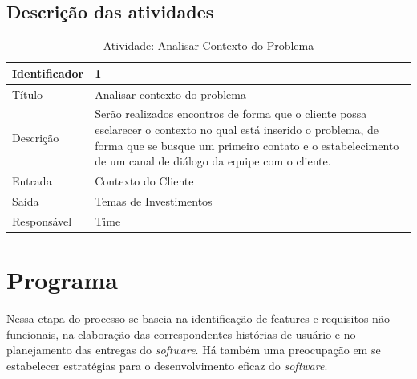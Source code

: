 \subsection{Descrição das atividades}


\begin{table}[]
\centering
\caption{Atividade: Analisar Contexto do Problema}
\label{atividade:1}
\begin{tabularx}{0.9\textwidth}{|>{}s |b|}
\hline
Identificador & 1                                                                                                                                                                                                                              \\ \hline
Título        & Analisar contexto do problema                                                                                                                                                                                                 \\ \hline
Descrição     & Serão realizados encontros de forma que o cliente possa esclarecer o contexto no qual está inserido o problema, de forma que se busque um primeiro contato e o estabelecimento de um canal de diálogo da equipe com o cliente. \\ \hline
Entrada       & Contexto do Cliente                                                                                                                                                                                                            \\ \hline
Saída         & Temas de Investimentos                                                                                                                                                                                                         \\ \hline
Responsável   & Time                                                                                                                                                                                                                           \\ \hline
\end{tabularx}
\end{table}

\section{Programa}
Nessa etapa do processo se baseia na identificação de features e requisitos não-funcionais, na elaboração das correspondentes histórias de usuário e no planejamento das entregas do \textit{software}. Há também uma preocupação em se estabelecer estratégias para o desenvolvimento eficaz do \textit{software}.

